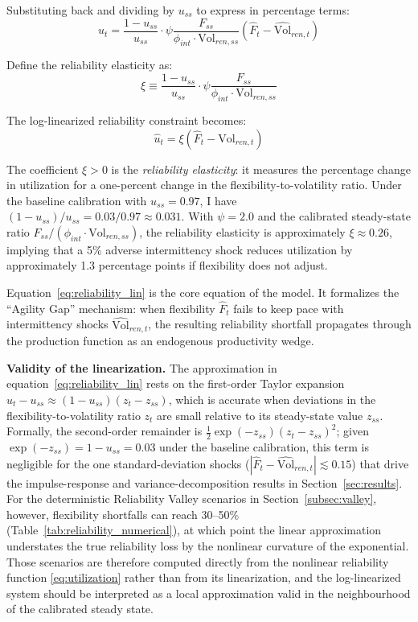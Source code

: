 \documentclass[12pt, a4paper]{article}
\begin{document}
Substituting back and dividing by $u_{ss}$ to express in percentage terms:
\begin{equation}
\hat{u}_t = \frac{1-u_{ss}}{u_{ss}} \cdot \psi \frac{F_{ss}}{\phi_{int} \cdot \text{Vol}_{ren,ss}} (\hat{F}_t - \hat{\text{Vol}}_{ren,t})
\end{equation}

Define the reliability elasticity as:
\begin{equation}
\xi \equiv \frac{1-u_{ss}}{u_{ss}} \cdot \psi \frac{F_{ss}}{\phi_{int} \cdot \text{Vol}_{ren,ss}}
\end{equation}

The log-linearized reliability constraint becomes:
\begin{equation}
\boxed{
\hat{u}_t = \xi \left(\hat{F}_t - \hat{\text{Vol}}_{ren,t}\right)
}
\label{eq:reliability_lin}
\end{equation}

The coefficient $\xi > 0$ is the \textit{reliability elasticity}: it measures the percentage change in utilization for a one-percent change in the flexibility-to-volatility ratio. Under the baseline calibration with $u_{ss} = 0.97$, I have $(1-u_{ss})/u_{ss} = 0.03/0.97 \approx 0.031$. With $\psi = 2.0$ and the calibrated steady-state ratio $F_{ss}/(\phi_{int} \cdot \text{Vol}_{ren,ss})$, the reliability elasticity is approximately $\xi \approx 0.26$, implying that a 5\% adverse intermittency shock reduces utilization by approximately 1.3 percentage points if flexibility does not adjust.

Equation~\eqref{eq:reliability_lin} is the core equation of the model. It formalizes the ``Agility Gap'' mechanism: when flexibility $\hat{F}_t$ fails to keep pace with intermittency shocks $\hat{\text{Vol}}_{ren,t}$, the resulting reliability shortfall propagates through the production function as an endogenous productivity wedge.

\noindent \textbf{Validity of the linearization.} The approximation in equation~\eqref{eq:reliability_lin} rests on the first-order Taylor expansion $u_t - u_{ss} \approx (1-u_{ss})(z_t - z_{ss})$, which is accurate when deviations in the flexibility-to-volatility ratio $z_t$ are small relative to its steady-state value $z_{ss}$. Formally, the second-order remainder is $\frac{1}{2}\exp(-z_{ss})(z_t - z_{ss})^2$; given $\exp(-z_{ss}) = 1 - u_{ss} = 0.03$ under the baseline calibration, this term is negligible for the one standard-deviation shocks ($|\hat{F}_t - \hat{\text{Vol}}_{ren,t}| \lesssim 0.15$) that drive the impulse-response and variance-decomposition results in Section~\ref{sec:results}. For the deterministic Reliability Valley scenarios in Section~\ref{subsec:valley}, however, flexibility shortfalls can reach 30--50\% (Table~\ref{tab:reliability_numerical}), at which point the linear approximation understates the true reliability loss by the nonlinear curvature of the exponential. Those scenarios are therefore computed directly from the nonlinear reliability function \eqref{eq:utilization} rather than from its linearization, and the log-linearized system should be interpreted as a local approximation valid in the neighbourhood of the calibrated steady state.
\end{document}
